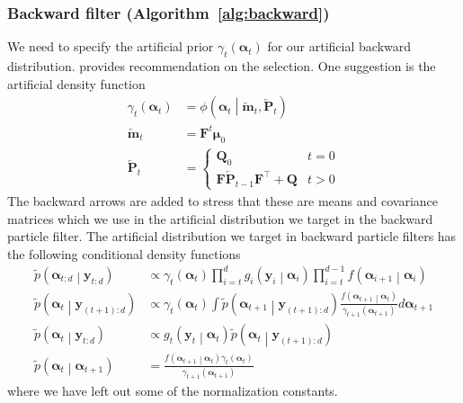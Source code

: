 \documentclass[notitlepage]{article}
\renewcommand{\vec}[1]{\bm{#1}}
\newcommand{\vecLarrow}[1]{\overleftarrow{\vec{#1}}}
\newcommand{\mat}[1]{\mathbf{#1}}
\newcommand{\matLarrow}[1]{\overleftarrow{\mat{#1}}}
\newcommand{\Lparen}[1]{\left( #1\right)}
\newcommand{\Cond}[2]{ #1 \middle\vert  #2}
\newcommand{\optor}[2]{#1\Lparen{#2}}
\newcommand{\optorC}[3]{\optor{#1}{\Cond{#2}{#3}}}
\newcommand{\pdenstC}[2]{\optorC{\widetilde p}{#1}{#2}}
\newcommand{\normaldC}[3]{\optorC{\phi}{#1}{#2,#3}}
\newcommand{\nPeriods}{d}
\begin{document}
\subsubsection*{Backward filter (Algorithm~\ref{alg:backward})}
We need to specify the artificial prior $\gamma_t\Lparen{\vec{\alpha}_t}$ for our artificial backward distribution. 
\citet[page 69 and 70]{briers09} provides recommendation on the selection. One suggestion is the artificial density function %
%
\begin{equation}\begin{split}\label{eq:artfiPrior}
	\gamma_t\Lparen{\vec{\alpha}_t} &=
		\normaldC{\vec{\alpha}_t}{\vecLarrow{m}_t}{\matLarrow{P}_t} \\
%
	\vecLarrow{m}_t &= \mat{F}^t\vec\mu_0 \\
%
	\matLarrow{P}_t &= \left\{
		\begin{matrix} \mat{Q}_0 & t = 0 \\ \mat{F}\matLarrow{P}_{t - 1}\mat{F}^\top + 
		\mat{Q} & t > 0   \end{matrix} \right.
\end{split}\end{equation}%
%
The backward arrows are added to stress that these are means and covariance matrices which we use in 
the artificial distribution we target in the backward particle filter. 
The artificial distribution we target in backward particle filters has
the following conditional density functions%
%
\begin{align}
\pdenstC{\vec{\alpha}_{t:d}}{\vec{y}_{t:\nPeriods}} &\propto 
	\gamma_t \Lparen{\vec{\alpha}_t}
	\prod_{i=t}^d \optorC{g_i}{\vec y_i}{\vec\alpha_i}
	\prod_{i=t}^{d-1} \optorC{f}{\vec\alpha_{i + 1}}{\vec\alpha_i} \nonumber\\
\pdenstC{\vec{\alpha}_t}{\vec{y}_{(t + 1):\nPeriods}} & \propto
	\gamma_t(\vec\alpha_t)
	\int \pdenstC{\vec{\alpha}_{t+1}}{\vec{y}_{(t+1):\nPeriods}}
	\frac{
		\optorC{f}{\vec\alpha_{t + 1}}{\vec\alpha_t}%
	}{
		\gamma_{t+1}(\vec\alpha_{t+1})	
	}d\vec\alpha_{t+1} \nonumber\\
\pdenstC{\vec{\alpha}_t}{\vec{y}_{t:\nPeriods}} &\propto 
	\optorC{g_t}{\vec y_t}{\vec\alpha_t}
	\pdenstC{\vec{\alpha}_t}{\vec{y}_{(t + 1):\nPeriods}} \nonumber\\
\pdenstC{\vec{\alpha}_t}{\vec{\alpha}_{t +1}} &= \label{eq:bwTrans}
	\frac{
		\optorC{f}{\vec\alpha_{t+1}}{\vec\alpha_t}
		\gamma_t(\vec\alpha_t)
	}{\gamma_{t+1}(\vec\alpha_{t + 1})}
\end{align}%
%
where we have left out some of the normalization constants. 
\end{document}
